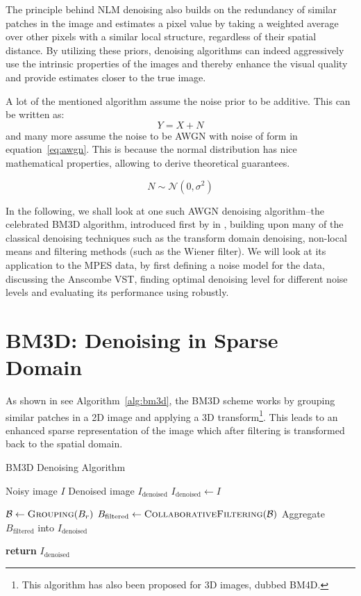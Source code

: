 The principle behind \gls{NLM} denoising also builds on the redundancy of similar patches in the image and estimates a pixel value by taking a weighted average over other pixels with a similar local structure, regardless of their spatial distance. By utilizing these priors, denoising algorithms can indeed aggressively use the intrinsic properties of the images and thereby enhance the visual quality and provide estimates closer to the true image.

A lot of the mentioned algorithm assume the noise prior to be additive. This can be written as:
\begin{equation}
    Y = X + N
\end{equation}
and many more assume the noise to be \gls{AWGN} with noise of form in equation~\ref{eq:awgn}. This is because the normal distribution has nice mathematical properties, allowing to derive theoretical guarantees.

\begin{equation}\label{eq:awgn}
    N \sim \mathcal{N}(0, \sigma^2)
\end{equation}

In the following, we shall look at one such \gls{AWGN} denoising algorithm--the celebrated \gls{BM3D} algorithm, introduced first by \citeauthor{dabovImageDenoisingSparse2007} in \cite{dabovImageDenoisingSparse2007}, building upon many of the classical denoising techniques such as the transform domain denoising, non-local means and filtering methods (such as the Wiener filter). We will look at its application to the \gls{MPES} data, by first defining a noise model for the data, discussing the Anscombe \gls{VST}, finding optimal denoising level for different noise levels and evaluating its performance using robustly.

\section{BM3D: Denoising in Sparse Domain}
As shown in see Algorithm~\ref{alg:bm3d}, the \gls{BM3D} scheme works by grouping similar patches in a 2D image and applying a 3D transform\footnote{This algorithm has also been proposed for 3D images, dubbed BM4D.}. This leads to an enhanced sparse representation of the image which after filtering is transformed back to the spatial domain.
\begin{algorithm}
    \caption{BM3D Denoising Algorithm}\label{alg:bm3d}
    \begin{algorithmic}[1]
    \Require Noisy image $I$
    \Ensure Denoised image $I_{\text{denoised}}$
    \Statex
        \State $I_{\text{denoised}} \gets I$
        
            \State $\mathcal{B} \gets \textsc{Grouping}(B_r)$
            \State $B_{\text{filtered}} \gets \textsc{CollaborativeFiltering}(\mathcal{B})$
            \State Aggregate $B_{\text{filtered}}$ into $I_{\text{denoised}}$
        \EndFor
        
        \State \textbf{return} $I_{\text{denoised}}$
    \EndProcedure
    \end{algorithmic}
\end{algorithm}

